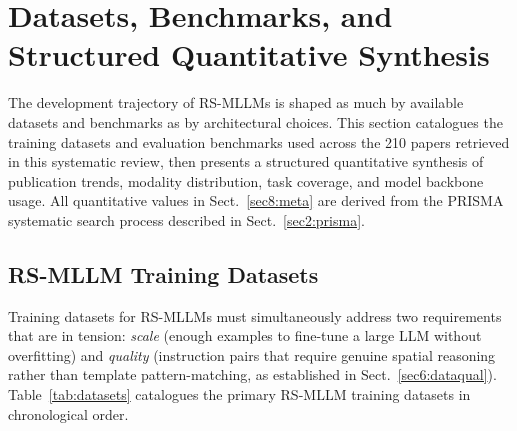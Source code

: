 
\section{Datasets, Benchmarks, and Structured Quantitative Synthesis}\label{sec8}

The development trajectory of RS-MLLMs is shaped as much by available datasets
and benchmarks as by architectural choices. This section catalogues the training
datasets and evaluation benchmarks used across the 210 papers retrieved in this
systematic review, then presents a structured quantitative synthesis of publication trends, modality
distribution, task coverage, and model backbone usage. All quantitative values
in Sect.~\ref{sec8:meta} are derived from the PRISMA systematic search process
described in Sect.~\ref{sec2:prisma}.

\subsection{RS-MLLM Training Datasets}\label{sec8:datasets}

Training datasets for RS-MLLMs must simultaneously address two requirements
that are in tension: \emph{scale} (enough examples to fine-tune a large LLM
without overfitting) and \emph{quality} (instruction pairs that require genuine
spatial reasoning rather than template pattern-matching, as established in
Sect.~\ref{sec6:dataqual}). Table~\ref{tab:datasets} catalogues the primary
RS-MLLM training datasets in chronological order.

